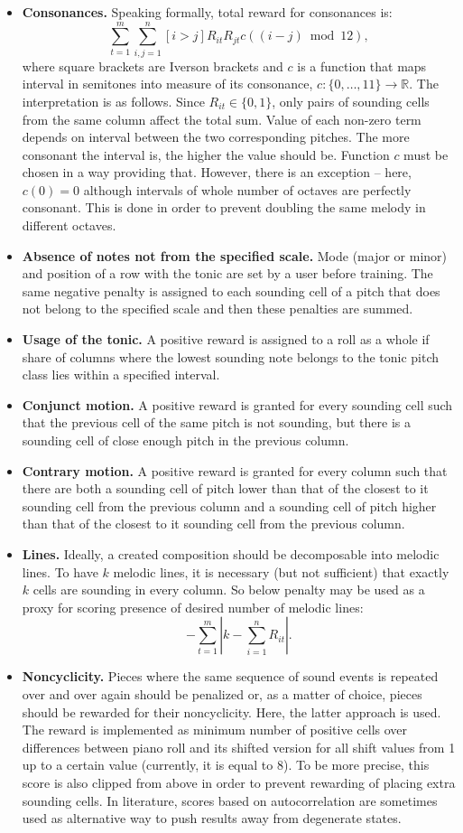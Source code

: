 \documentclass{article}
\begin{document}
\begin{itemize}
	\item \textbf{Consonances.} Speaking formally, total reward for consonances is:
	$$\sum_{t = 1}^m \sum_{i, j = 1}^n [i > j]R_{it} R_{jt} c((i - j) \bmod 12),$$
	where square brackets are Iverson brackets and $c$ is a function that maps interval in semitones into measure of its consonance, $c: \{0, \dots, 11\} \to \mathbb{R}$.
	The interpretation is as follows. Since $R_{it} \in \{0, 1\}$, only pairs of sounding cells from the same column affect the total sum. Value of each non-zero term depends on interval between the two corresponding pitches. The more consonant the interval is, the higher the value should be. Function $c$ must be chosen in a way providing that. However, there is an exception -- here, $c(0) = 0$ although intervals of whole number of octaves are perfectly consonant. This is done in order to prevent doubling the same melody in different octaves. 
	\item \textbf{Absence of notes not from the specified scale.} Mode (major or minor) and position of a row with the tonic are set by a user before training. The same negative penalty is assigned to each sounding cell of a pitch that does not belong to the specified scale and then these penalties are summed.
	\item \textbf{Usage of the tonic.} A positive reward is assigned to a roll as a whole if share of columns where the lowest sounding note belongs to the tonic pitch class lies within a specified interval.  
	\item \textbf{Conjunct motion.} A positive reward is granted for every sounding cell such that the previous cell of the same pitch is not sounding, but there is a sounding cell of close enough pitch in the previous column.
	\item \textbf{Contrary motion.} A positive reward is granted for every column such that there are both a sounding cell of pitch lower than that of the closest to it sounding cell from the previous column and a sounding cell of pitch higher than that of the closest to it sounding cell from the previous column.
	\item \textbf{Lines.} Ideally, a created composition should be decomposable into melodic lines. To have $k$ melodic lines, it is necessary (but not sufficient) that exactly $k$ cells are sounding in every column. So below penalty may be used as a proxy for scoring presence of desired number of melodic lines:
	$$-\sum_{t = 1}^m \left| k - \sum_{i=1}^n R_{it} \right|.$$  
    \item \textbf{Noncyclicity.} Pieces where the same sequence of sound events is repeated over and over again should be penalized or, as a matter of choice, pieces should be rewarded for their noncyclicity. Here, the latter approach is used. The reward is implemented as minimum number of positive cells over differences between piano roll and its shifted version for all shift values from 1 up to a certain value (currently, it is equal to 8). To be more precise, this score is also clipped from above in order to prevent rewarding of placing extra sounding cells. In literature, scores based on autocorrelation are sometimes used as alternative way to push results away from degenerate states.

\end{itemize}
\end{document}
